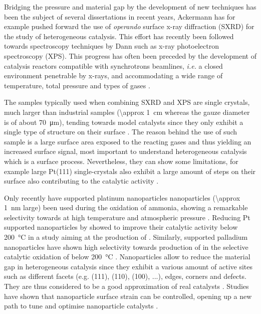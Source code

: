 Bridging the pressure and material gap by the development of new techniques has been the subject of several dissertations in recent years, Ackermann \parencite*{Ackermann2007} has for example pushed forward the use of \textit{operando} surface x-ray diffraction (SXRD) for the study of heterogeneous catalysis.
This effort has recently been followed towards spectroscopy techniques by Dann \parencite*{Dann2019} such as x-ray photoelectron spectroscopy (XPS).
This progress has often been preceded by the development of catalysis reactors compatible with synchrotrons beamlines, \textit{i.e.} a closed environment penetrable by x-rays, and accommodating a wide range of temperature, total pressure and types of gases \parencite{VanRijn2010}.

The samples typically used when combining SXRD and XPS are single crystals, much larger than industrial samples (\qty{\approx 1}{\cm} whereas the gauze diameter is of about \qty{70}{\um}), tending towards model catalysts since they only exhibit a single type of structure on their surface \parencite{Goodman1994}.
The reason behind the use of such sample is a large surface area exposed to the reacting gases and thus yielding an increased surface signal, most important to understand heterogeneous catalysis which is a surface process.
Nevertheless, they can show some limitations, for example large Pt(111) single-crystals also exhibit a large amount of steps on their surface also contributing to the catalytic activity \parencite{CalleVallejo2017}.

Only recently have supported platinum nanoparticles nanoparticles (\qty{\approx 1}{\nm} large) been used during the oxidation of ammonia, showing a remarkable selectivity towards  at high temperature and atmospheric pressure \parencite{Schaffer2013}.
Reducing Pt supported nanoparticles by  showed to improve their catalytic activity below \qty{200}{\degreeCelsius} in a study aiming at the production of  \parencite{Svintsitskiy2020}.
Similarly, supported palladium nanoparticles have shown high selectivity towards production of  in the selective catalytic oxidation of  below \qty{200}{\degreeCelsius} \parencite{Dann2019}.
Nanoparticles allow to reduce the material gap in heterogeneous catalysis since they exhibit a various amount of active sites such as different facets (e.g. (111), (110), (100), ...), edges, corners and defects.
They are thus considered to be a good approximation of real catalysts \parencite{Somorjai2007, Molenbroek2009, Cuenya2010, Kwangjin2012, Schauermann2013}.
Studies have shown that nanoparticle surface strain can be controlled, opening up a new path to tune and optimise nanoparticle catalysts \parencite{Zhang2014, Sneed2015, Wang2016}.

